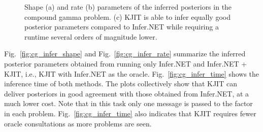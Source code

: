 \documentclass[english]{article}
\theoremstyle{plain}
\theoremstyle{plain}
\newcommand{\figref}[1]{Fig.~\ref{#1}}
\begin{document}
\begin{figure}[ht]
  \centering
  \caption{Shape (a) and rate (b) parameters of the inferred posteriors in 
  the compound gamma problem. 
  (c) KJIT is able to infer equally good posterior parameters compared to Infer.NET 
  while requiring a runtime several orders of magnitude lower. 
  }
  \label{fig:cg_performance}
\end{figure}

\figref{fig:cg_infer_shape} and \figref{fig:cg_infer_rate} summarize the inferred 
posterior parameters obtained from running only Infer.NET and Infer.NET + KJIT, i.e., 
KJIT with Infer.NET as the oracle. \figref{fig:cg_infer_time} shows the inference 
time of both methods. The plots collectively show that KJIT can deliver posteriors 
in good agreement with those obtained from Infer.NET, at a much lower cost. 
Note that in this task only one message is passed to the factor in each problem.
\figref{fig:cg_infer_time} also indicates that KJIT requires fewer oracle 
consultations as more problems are seen.
\end{document}
